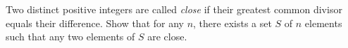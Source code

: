 Two distinct positive integers are called \textit{close } if their greatest common divisor equals their difference. Show that for any $n$, there exists a set $S$ of $n$ elements such that any two elements of $S$ are close.